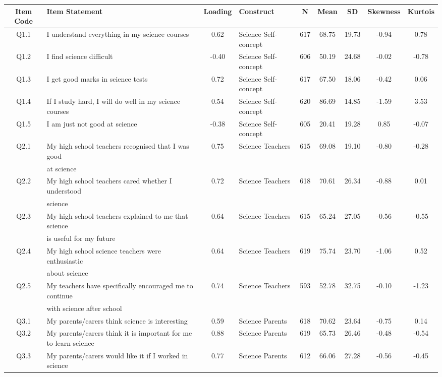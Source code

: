 \begin{landscape}
\begin{table}
\centering
\begin{tabular}[width = \textwidth]{clclccccc}
  \hline
Item Code & Item Statement & Loading & Construct & N & Mean & SD & Skewness & Kurtois \\
  \hline
Q1.1 & I understand everything in my science courses & 0.62 & Science Self-concept & 617 &68.75 & 19.73& -0.94&0.78\\
Q1.2 &   I find science difficult & -0.40 & Science Self-concept & 606 & 50.19 & 24.68 & -0.02&-0.78\\
Q1.3 &   I get good marks in science tests & 0.72 & Science Self-concept &617 & 67.50&18.06 & -0.42&0.06\\
Q1.4 &  If I study hard, I will do well in my science courses & 0.54 & Science Self-concept &620&86.69 &14.85	 &-1.59&3.53\\
Q1.5 &  I am just not good at science & -0.38 & Science Self-concept & 605& 20.41& 19.28& 0.85&-0.07\\
  \hline
Q2.1 &  My high school teachers recognised that I was good & 0.75 & Science Teachers &615&69.08	 &19.10 & -0.80&-0.28\\
&at science&&&&&&&\\
Q2.2 &  My high school teachers cared whether I understood& 0.72 & Science Teachers &618&70.61 &26.34 & -0.88&0.01\\
&science&&&&&&&\\
Q2.3 &  My high school teachers explained to me that science& 0.64 & Science Teachers &615&65.24&27.05 &-0.56	&-0.55	\\
& is useful for my future&&&&&&& \\
Q2.4 &   My high school science teachers were enthusiastic & 0.64 & Science Teachers &619	&75.74&23.70 & -1.06&0.52	\\
&about science&&&&&&& \\
Q2.5 &  My teachers have specifically encouraged me to continue & 0.74 & Science Teachers &593&52.78&32.75 & -0.10&-1.23\\
& with science after school&&&&&&& \\
  \hline
Q3.1 & My parents/carers think science is interesting & 0.59 & Science Parents &618	&70.62&	23.64	 &-0.75	&0.14  \\
Q3.2 & My parents/carers think it is important for me to learn science & 0.88 & Science Parents &619&65.73&26.46	 &-0.48	&-0.54	\\  
Q3.3 & My parents/carers would like it if I worked in science & 0.77 & Science Parents   &612&66.06&27.28 & -0.56&-0.45\\

\end{tabular}
\end{table}
\end{landscape}
